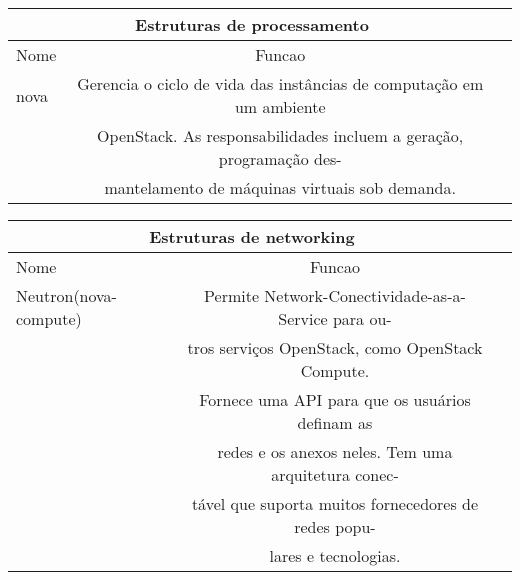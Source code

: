 \documentclass[a4paper]{book}
\begin{document}
			\begin{center}
				\begin{tabular}{|l||c|c|}
				\hline
				\multicolumn{2}{|c|}{\textbf{Estruturas de processamento}}\\
				\hline
				Nome		&Funcao\\
				\hline \hline
				nova&	Gerencia o ciclo de vida das instâncias de computação em um 							ambiente \\&OpenStack. As responsabilidades incluem a geração, 								programação des-\\&mantelamento de máquinas virtuais sob demanda.\\
				\hline
				\end{tabular}
			\end{center}
			
			\begin{center}
				\begin{tabular}{|l||c|c|}
				\hline
				\multicolumn{2}{|c|}{\textbf{Estruturas de networking}}\\
				\hline
				Nome		&Funcao\\
				\hline \hline
				Neutron(nova-compute)&	Permite Network-Conectividade-as-a-Service para ou-\\&tros serviços OpenStack, como OpenStack Compute.\\& Fornece uma API para que os usuários definam as\\& redes e os anexos neles. Tem uma arquitetura conec-\\&tável que suporta muitos fornecedores de redes popu-\\&lares e tecnologias.\\
				\hline
				\end{tabular}
			\end{center}
\end{document}
